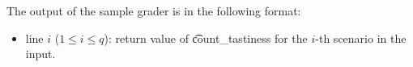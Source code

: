 The output of the sample grader is in the following format:
\begin{itemize}
\item line $i$ ($1 \leq i \leq q$): return value of \t{count\_tastiness} for the $i$-th scenario in the input.
\end{itemize}